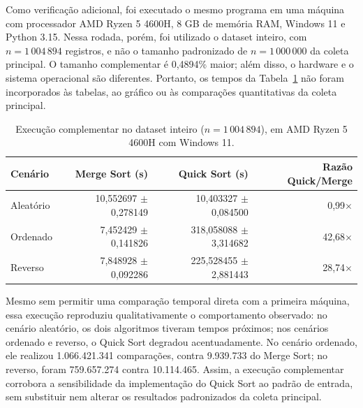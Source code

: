 \documentclass[12pt]{article}
\begin{document}
Como verificação adicional, foi executado o mesmo programa em uma máquina com
processador AMD Ryzen 5 4600H, 8 GB de memória RAM, Windows 11 e Python 3.15.
Nessa rodada, porém, foi utilizado o dataset inteiro, com $n=1\,004\,894$
registros, e não o tamanho padronizado de $n=1\,000\,000$ da coleta principal.
O tamanho complementar é 0,4894\% maior; além disso, o hardware e o sistema
operacional são diferentes. Portanto, os tempos da Tabela~\ref{tab:segunda-maquina}
não foram incorporados às tabelas, ao gráfico ou às comparações quantitativas
da coleta principal.

\begin{table}[H]
\centering
\caption{Execução complementar no dataset inteiro ($n=1\,004\,894$), em
AMD Ryzen 5 4600H com Windows 11.}
\label{tab:segunda-maquina}
\footnotesize
\setlength{\tabcolsep}{4pt}
\begin{tabular}{lrrr}
\toprule
Cenário & Merge Sort (s) & Quick Sort (s) & Razão Quick/Merge \\
\midrule
Aleatório & 10,552697 $\pm$ 0,278149 & 10,403327 $\pm$ 0,084500 & 0,99$\times$ \\
Ordenado  & 7,452429 $\pm$ 0,141826 & 318,058088 $\pm$ 3,314682 & 42,68$\times$ \\
Reverso   & 7,848928 $\pm$ 0,092286 & 225,528455 $\pm$ 2,881443 & 28,74$\times$ \\
\bottomrule
\end{tabular}
\end{table}

Mesmo sem permitir uma comparação temporal direta com a primeira máquina,
essa execução reproduziu qualitativamente o comportamento observado: no
cenário aleatório, os dois algoritmos tiveram tempos próximos; nos cenários
ordenado e reverso, o Quick Sort degradou acentuadamente. No cenário ordenado,
ele realizou 1.066.421.341 comparações, contra 9.939.733 do Merge Sort; no
reverso, foram 759.657.274 contra 10.114.465. Assim, a execução complementar
corrobora a sensibilidade da implementação do Quick Sort ao padrão de entrada,
sem substituir nem alterar os resultados padronizados da coleta principal.
\end{document}
